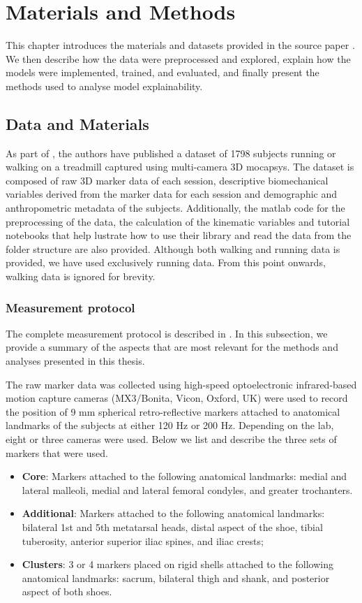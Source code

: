 \chapter{Materials and Methods}\label{chap:materials-methods}
This chapter introduces the materials and datasets provided in the source paper \citep{Ferber2024}. We then describe how the data were preprocessed and explored, explain how the models were implemented, trained, and evaluated, and finally present the methods used to analyse model explainability.

\section{Data and Materials}\label{sec:method-data-materials}
As part of \citet{Ferber2024}, the authors have published a dataset of 1798 \glspl{subject} running or walking on a treadmill captured using multi-camera 3D \gls{mocapsys}. The dataset is composed of raw 3D marker data of each \gls{session}, descriptive biomechanical variables derived from the marker data for each session and demographic and anthropometric metadata of the subjects. Additionally, the matlab code for the preprocessing of the data, the calculation of the kinematic variables and tutorial notebooks that help lustrate how to use their library and read the data from the folder structure are also provided. Although both walking and running data is provided, we have used exclusively running data. From this point onwards, walking data is ignored for brevity.

\subsection{Measurement protocol}\label{subsec:measurement-protocol}
The complete measurement protocol is described in \citet{Ferber2024}. In this subsection, we provide a summary of the aspects that are most relevant for the methods and analyses presented in this thesis.

The raw marker data was collected using high-speed optoelectronic infrared-based motion capture cameras (MX3/Bonita, Vicon, Oxford, UK) were used to record the position of 9 mm spherical retro-reflective markers attached to anatomical landmarks of the subjects at either 120 Hz or 200 Hz. Depending on the lab, eight or three cameras were used. Below we list and describe the three sets of markers that were used.
\begin{itemize}
    \item \textbf{Core}: Markers attached to the following anatomical landmarks: medial and lateral malleoli, medial and lateral femoral condyles, and greater trochanters.
    \item \textbf{Additional}: Markers attached to the following anatomical landmarks: bilateral 1st and 5th metatarsal heads, distal aspect of the shoe, tibial tuberosity, anterior superior iliac spines, and iliac crests;
    \item \textbf{Clusters}: 3 or 4 markers placed on rigid shells attached to the following anatomical landmarks: sacrum, bilateral thigh and shank, and posterior aspect of both shoes.
\end{itemize}

